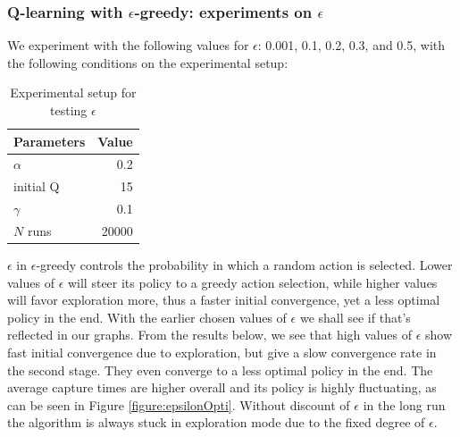 \documentclass[paper=a4, fontsize=11pt]{scrartcl}
\numberwithin{equation}{section}		%
\numberwithin{figure}{section}			%
\numberwithin{table}{section}				%
\begin{document}
\subsubsection*{Q-learning with $\epsilon$-greedy: experiments on $\epsilon$}
We experiment with the following values for $\epsilon$: 0.001, 0.1, 0.2, 0.3, and 0.5, with the following conditions on the experimental setup:
\begin{table}[H]
\caption{Experimental setup for testing $\epsilon$}
\centering
\begin{tabular}{|l|r|}
\hline
Parameters & Value \\\hline
$\alpha$ & 0.2 \\\hline
initial Q & 15 \\\hline
$\gamma$ & 0.1\\\hline
$N$ runs & 20000\\\hline
\end{tabular}
\label{expSetupEpsilon}
\end{table}
$\epsilon$ in $\epsilon$-greedy controls the probability in which a random action is selected. Lower values of $\epsilon$ will steer its policy to a greedy action selection, while higher values will favor exploration more, thus a faster initial  convergence, yet a less optimal policy in the end. With the earlier chosen values of $\epsilon$ we shall see if that's reflected in our graphs. From the results below, we see that high values of $\epsilon$ show fast initial convergence due to exploration, but give a slow convergence rate in the second stage. They even converge to a less optimal policy in the end. The average capture times are higher overall and its policy is highly fluctuating, as can be seen in Figure \ref{figure:epsilonOpti}. Without discount of $\epsilon$ in the long run the algorithm is always stuck in exploration mode due to the fixed degree of $\epsilon$.
\end{document}
